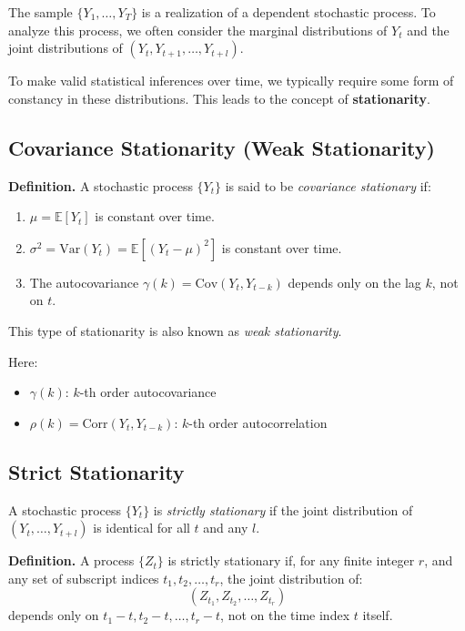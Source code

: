\documentclass[12pt, oneside]{article}
\begin{document}
The sample \( \{Y_1, \dots, Y_T\} \) is a realization of a dependent stochastic process. To analyze this process, we often consider the marginal distributions of \( Y_t \) and the joint distributions of \( (Y_t, Y_{t+1}, \dots, Y_{t+l}) \). 

To make valid statistical inferences over time, we typically require some form of constancy in these distributions. This leads to the concept of \textbf{stationarity}.

\subsection*{Covariance Stationarity (Weak Stationarity)}

\textbf{Definition.} A stochastic process \( \{Y_t\} \) is said to be \textit{covariance stationary} if:

\begin{enumerate}
  \item \( \mu = \mathbb{E}[Y_t] \) is constant over time.
  \item \( \sigma^2 = \text{Var}(Y_t) = \mathbb{E}[(Y_t - \mu)^2] \) is constant over time.
  \item The autocovariance \( \gamma(k) = \text{Cov}(Y_t, Y_{t-k}) \) depends only on the lag \( k \), not on \( t \).
\end{enumerate}

This type of stationarity is also known as \textit{weak stationarity}.

Here:
\begin{itemize}
  \item \( \gamma(k) \): \( k \)-th order autocovariance
  \item \( \rho(k) = \text{Corr}(Y_t, Y_{t-k}) \): \( k \)-th order autocorrelation
\end{itemize}

\subsection*{Strict Stationarity}

A stochastic process \( \{Y_t\} \) is \textit{strictly stationary} if the joint distribution of \( (Y_t, \dots, Y_{t+l}) \) is identical for all \( t \) and any \( l \).

\textbf{Definition.} A process \( \{Z_t\} \) is strictly stationary if, for any finite integer \( r \), and any set of subscript indices \( t_1, t_2, \dots, t_r \), the joint distribution of:
\[
(Z_{t_1}, Z_{t_2}, \dots, Z_{t_r})
\]
depends only on \( t_1 - t, t_2 - t, \dots, t_r - t \), not on the time index \( t \) itself.
\end{document}
